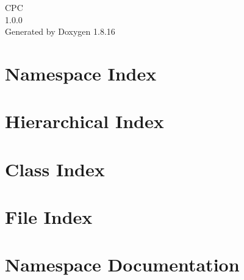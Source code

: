 \let\mypdfximage\pdfximage\def\pdfximage{\immediate\mypdfximage}\documentclass[twoside]{book}
\newcommand{\+}{\discretionary{\mbox{\scriptsize$\hookleftarrow$}}{}{}}
\newcommand{\clearemptydoublepage}{%
  \newpage{\pagestyle{empty}\cleardoublepage}%
}
\begin{document}
\hypersetup{pageanchor=false,
             bookmarksnumbered=true,
             pdfencoding=unicode
            }
\begin{titlepage}
\vspace*{7cm}
\begin{center}%
{\Large C\+PC \\[1ex]\large 1.\+0.\+0 }\\
\vspace*{1cm}
{\large Generated by Doxygen 1.8.16}\\
\end{center}
\end{titlepage}
\clearemptydoublepage
{}
\tableofcontents
\clearemptydoublepage
{}
\hypersetup{pageanchor=true}

\chapter{Namespace Index}

\chapter{Hierarchical Index}

\chapter{Class Index}

\chapter{File Index}

\chapter{Namespace Documentation}









\end{document}
